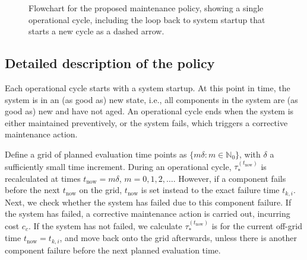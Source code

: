 \documentclass[authoryear]{elsarticle}
\newcommand{\naturals}{\mathbb{N}}
\def\tnow{t_\text{now}}
\newcommand{\tausnow}{\tau_*^{(\tnow)}}
\begin{document}
\begin{figure}
\begin{tikzpicture}
\end{tikzpicture}
\caption{Flowchart for the proposed maintenance policy,
showing a single operational cycle,
including the loop back to system startup that starts a new cycle as a dashed arrow.}
\label{fig:procedure}
\end{figure}

\subsection{Detailed description of the policy}
\label{sec:operationalprocedure}

Each operational cycle starts with a system startup.
At this point in time, the system is in an (as good as) new state,
i.e., all components in the system are (as good as) new and have not aged.
An operational cycle ends when the system is either maintained preventively, %
or the system fails, which triggers a corrective maintenance action.

Define a grid of planned evaluation time points as $\{m \delta : m \in \naturals_0\}$,
with $\delta$ a sufficiently small time increment.
During an operational cycle,
$\tausnow$ is recalculated at times $\tnow = m \delta$, $m = 0, 1, 2, \ldots$.
However, if a component fails before the next $\tnow$ on the grid,
$\tnow$ is set instead to the exact failure time $t_{k,i}$.
Next, we check whether the system has failed due to this component failure.
If the system has failed, a corrective maintenance action is carried out, incurring cost $c_c$.
If the system has not failed, we calculate $\tausnow$ is for the current off-grid time $\tnow = t_{k,i}$,
and move back onto the grid afterwards,
unless there is another component failure before the next planned evaluation time.
\end{document}
